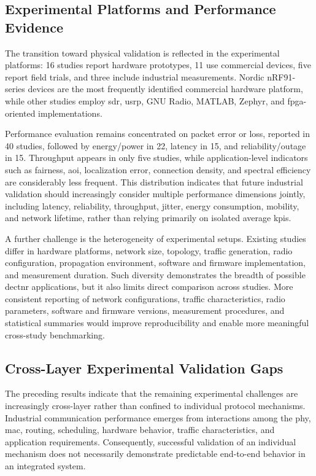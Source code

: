 \documentclass[conference]{IEEEtran}
\begin{document}
\subsection{Experimental Platforms and Performance Evidence}
\label{subsec:platforms_metrics}

The transition toward physical validation is reflected in the
experimental platforms: 16 studies report hardware prototypes, 11
use commercial devices, five report field trials, and three include
industrial measurements. Nordic nRF91-series devices are the most
frequently identified commercial hardware platform, while other
studies employ \gls{sdr}, \gls{usrp}, GNU Radio, MATLAB, Zephyr, and
\gls{fpga}-oriented implementations.

Performance evaluation remains concentrated on packet error or loss,
reported in 40 studies, followed by energy/power in 22, latency in 15,
and reliability/outage in 15. Throughput appears in only five studies,
while application-level indicators such as fairness, \gls{aoi},
localization error, connection density, and spectral efficiency are
considerably less frequent. This distribution indicates that future
industrial validation should increasingly consider multiple
performance dimensions jointly, including latency, reliability,
throughput, jitter, energy consumption, mobility, and network
lifetime, rather than relying primarily on isolated average
\glspl{kpi}.

A further challenge is the heterogeneity of experimental setups.
Existing studies differ in hardware platforms, network size, topology,
traffic generation, radio configuration, propagation environment,
software and firmware implementation, and measurement duration. Such
diversity demonstrates the breadth of possible \gls{dectnr}
applications, but it also limits direct comparison across studies.
More consistent reporting of network configurations, traffic
characteristics, radio parameters, software and firmware versions,
measurement procedures, and statistical summaries would improve
reproducibility and enable more meaningful cross-study benchmarking.


\subsection{Cross-Layer Experimental Validation Gaps}
\label{subsec:validation_gaps}

The preceding results indicate that the remaining experimental
challenges are increasingly cross-layer rather than confined to
individual protocol mechanisms. Industrial communication performance
emerges from interactions among the \gls{phy}, \gls{mac}, routing,
scheduling, hardware behavior, traffic characteristics, and
application requirements. Consequently, successful validation of an
individual mechanism does not necessarily demonstrate predictable
end-to-end behavior in an integrated system.
\end{document}
